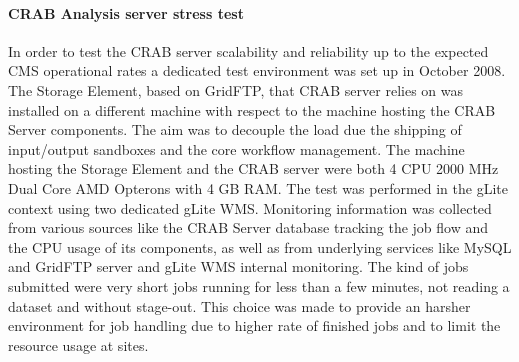 \paragraph{CRAB Analysis server stress test} 
In order to test the CRAB server scalability and reliability up to
the expected CMS operational rates a dedicated test environment was
set up in October 2008. The Storage Element, based on GridFTP, 
that CRAB server relies on was installed on a different machine with 
respect to the machine hosting the CRAB Server components. The aim was 
to decouple the load
due the shipping of input/output sandboxes and the core workflow
management. The machine hosting the Storage Element and the CRAB
server were both 4 CPU 2000 MHz Dual Core AMD Opterons with 4 GB
RAM. The test was performed in the gLite context using two dedicated
gLite WMS. Monitoring information was collected from various sources
like the CRAB Server database tracking the job flow and the CPU usage
of its components, as well as from underlying services like MySQL and
GridFTP server and gLite WMS internal monitoring. The kind of
jobs submitted were very short jobs running for less than a few
minutes, not reading a dataset and without stage-out. This choice was
made to provide an harsher environment for job handling due to higher
rate of finished jobs and to limit the resource usage at sites.

%
%

